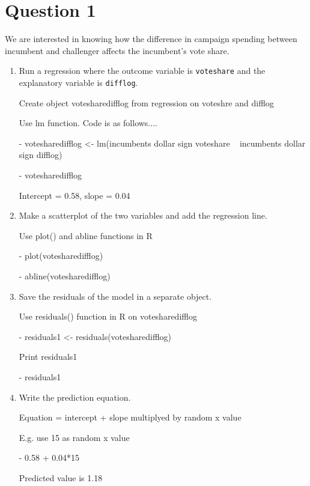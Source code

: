 \documentclass[12pt,letterpaper]{article}
\begin{document}
\section*{Question 1} %
\vspace{.25cm}
\noindent We are interested in knowing how the difference in campaign spending between incumbent and challenger affects the incumbent's vote share. 
	\begin{enumerate}
		\item Run a regression where the outcome variable is \texttt{voteshare} and the explanatory variable is \texttt{difflog}.	\vspace{5cm}
		
		Create object votesharedifflog from regression on voteshre and difflog
		
		Use lm function. Code is as follows....
		
	- votesharedifflog <- lm(incumbents dollar sign voteshare ~ incumbents dollar sign difflog)
	
	- votesharedifflog 
	
	Intercept = 0.58, slope = 0.04
		
	
	
		\item Make a scatterplot of the two variables and add the regression line. 	\vspace{7cm}
	
		Use plot() and abline functions in R
		
		- plot(votesharedifflog)
		
		- abline(votesharedifflog)
		\item Save the residuals of the model in a separate object.	\vspace{7cm}
		
		Use residuals() function in R on votesharedifflog
		
	- 	residuals1 <- residuals(votesharedifflog) 
	
	Print residuals1
	
	- 	residuals1
		\item Write the prediction equation.
		
		Equation = intercept + slope multiplyed by random x value
		
		E.g. use 15 as random x value
		
	- 	0.58 + 0.04*15
		
		Predicted value is 1.18
	\end{enumerate}
	
\newpage
\end{document}
